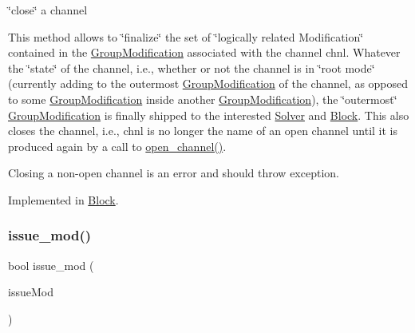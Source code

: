 \char`\"{}close\char`\"{} a channel 

This method allows to \char`\"{}finalize\char`\"{} the set of \char`\"{}logically related
\+Modification\char`\"{} contained in the \mbox{\hyperlink{class_s_m_spp__di__unipi__it_1_1_group_modification}{Group\+Modification}} associated with the channel chnl. Whatever the \char`\"{}state\char`\"{} of the channel, i.\+e., whether or not the channel is in \char`\"{}root mode\char`\"{} (currently adding to the outermost \mbox{\hyperlink{class_s_m_spp__di__unipi__it_1_1_group_modification}{Group\+Modification}} of the channel, as opposed to some \mbox{\hyperlink{class_s_m_spp__di__unipi__it_1_1_group_modification}{Group\+Modification}} inside another \mbox{\hyperlink{class_s_m_spp__di__unipi__it_1_1_group_modification}{Group\+Modification}}), the \char`\"{}outermost\char`\"{} \mbox{\hyperlink{class_s_m_spp__di__unipi__it_1_1_group_modification}{Group\+Modification}} is finally shipped to the interested \mbox{\hyperlink{class_s_m_spp__di__unipi__it_1_1_solver}{Solver}} and \mbox{\hyperlink{class_s_m_spp__di__unipi__it_1_1_block}{Block}}. This also closes the channel, i.\+e., chnl is no longer the name of an open channel until it is produced again by a call to \mbox{\hyperlink{class_s_m_spp__di__unipi__it_1_1_observer_acf7e46d450779f524e3655c5f31eecc8}{open\+\_\+channel()}}.

Closing a non-\/open channel is an error and should throw exception. 

Implemented in \mbox{\hyperlink{class_s_m_spp__di__unipi__it_1_1_block_ae6ecad455eb1f431127411f27b5eb10f}{Block}}.

\mbox{\label{class_s_m_spp__di__unipi__it_1_1_observer_aba36085f2ffb7811a1843482d5e83063}} 
\subsubsection{\texorpdfstring{issue\+\_\+mod()}{issue\_mod()}}
{\footnotesize\ttfamily bool issue\+\_\+mod (\begin{DoxyParamCaption}\item[{\mbox{\hyperlink{group___modification___t_y_p_e_s_ga544246d8c462e9a2d817c2c30797968f}{c\+\_\+\+Mod\+Param}}}]{issue\+Mod }\end{DoxyParamCaption})\hspace{0.3cm}{\ttfamily [inline]}}



